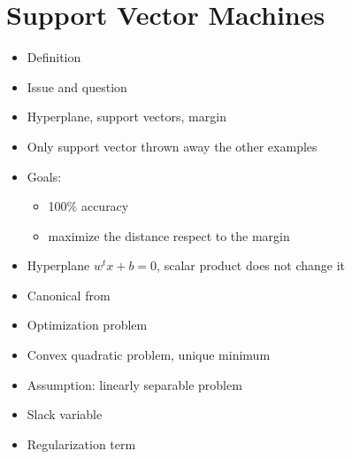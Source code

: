\documentclass[12pt,oneside]{report}
\begin{document}
\section{Support Vector Machines}
\begin{itemize}
    \item Definition
    \item Issue and question
    \item Hyperplane, support vectors, margin
    \item Only support vector thrown away the other examples
    \item Goals:
    \begin{itemize}
        \item 100\% accuracy
        \item maximize the distance respect to the margin
    \end{itemize}
    \item Hyperplane \(w^tx + b = 0\), scalar product does not change it
    \item Canonical from
    \item Optimization problem
    \item Convex quadratic problem, unique minimum
    \item Assumption: linearly separable problem
    \item Slack variable
    \item Regularization term
\end{itemize}
\end{document}
